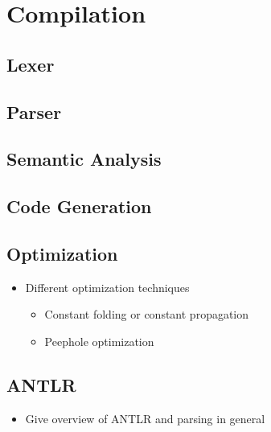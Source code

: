 \section{Compilation}

\subsection{Lexer}

\subsection{Parser}

\subsection{Semantic Analysis}

\subsection{Code Generation}

\subsection{Optimization}
\label{sec:background_compiler_codeOptimization}
\begin{itemize}
    \item Different optimization techniques
    \begin{itemize}
        \item Constant folding or constant propagation
        \item Peephole optimization
    \end{itemize}
\end{itemize}

\subsection{ANTLR}
\begin{itemize}
    \item Give overview of ANTLR and parsing in general
\end{itemize}